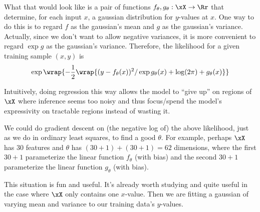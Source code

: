 What that would look like is a pair of functions $f_\theta,g_\theta:\xX\to\Rr$
that determine, for each input $x$, a gaussian distribution for $y$-values at
$x$.  One way to do this is to regard $f$ as the gaussian's mean and $g$ as the
gaussian's variance.  Actually, since we don't want to allow negative
variances, it is more convenient to regard $\exp g$ as the gaussian's variance.
Therefore, the likelihood for a given training sample $(x,y)$ is
$$
  \exp\wrap{-\frac{1}{2}\wrap{%
    (y-f_\theta(x))^2/\exp g_\theta(x)
    +
    \log(2\pi) + g_\theta(x)
    }}
$$

Intuitively, doing regression this way allows the model to ``give up'' on
regions of $\xX$ where inference seems too noisy and thus focus/spend the
model's expressivity on tractable regions instead of wasting it.

We could do gradient descent on (the negative log of) the above likelihood,
just as we do in ordinary least squares, to find a good $\theta$.  For example,
perhaps $\xX$ has $30$ features and $\theta$ has $(30+1)+(30+1)=62$ dimensions,
where the first $30+1$ parameterize the linear function $f_\theta$ (with bias)
and the second $30+1$ parameterize the linear function $g_\theta$ (with bias).

This situation is fun and useful.  It's already worth studying and quite useful
in the case where $\xX$ only contains one $x$-value.  Then we are fitting a
gaussian of varying mean and variance to our training data's $y$-values.



